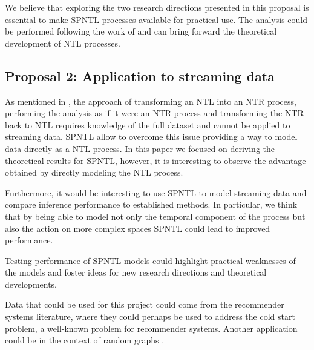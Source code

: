 We believe that exploring the two research directions presented in this proposal is essential to make SPNTL processes available for practical use. The analysis could be performed following the work of \cite{james2006poisson} and can bring forward the theoretical development of NTL processes.

\subsection{Proposal 2: Application to streaming data} %
As mentioned in , the approach of transforming an NTL into an NTR process, performing the analysis as if it were an NTR process and transforming the NTR back to NTL requires knowledge of the full dataset and cannot be applied to streaming data. SPNTL allow to overcome this issue providing a way to model data directly as a NTL process. In this paper we focused on deriving the theoretical results for SPNTL, however, it is interesting to observe the advantage obtained by directly modeling the NTL process. 

Furthermore, it would be interesting to use SPNTL to model streaming data and compare inference performance to established methods. In particular, we think that by being able to model not only the temporal component of the process but also the action on more complex spaces SPNTL could lead to improved performance.

Testing performance of SPNTL models could highlight practical weaknesses of the models and foster ideas for new research directions and theoretical developments.

Data that could be used for this project could come from the recommender systems literature, where they could perhaps be used to address the cold start problem, a well-known problem for recommender systems. Another application could be in the context of random graphs \cite{bloem2017preferential,bloem2018sampling}. 


